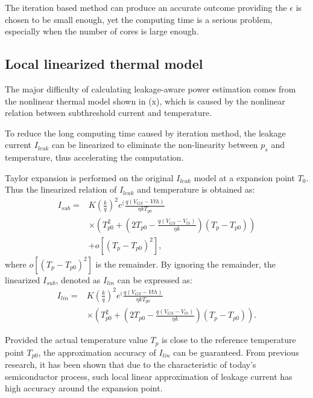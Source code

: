 The iteration based method can produce an accurate outcome providing the $\epsilon$ is chosen to be small enough, yet the computing time is a serious problem, especially when the number of cores is large enough.

\subsection{Local linearized thermal model}
The major difficulty of calculating leakage-aware power estimation comes from the nonlinear thermal model shown in (x), which is caused by the nonlinear relation between subthreshold current and temperature.

To reduce the long computing time caused by iteration method, the leakage current $I_{leak}$ can be linearized to eliminate the non-linearity between $p_{s}$ and temperature, thus accelerating the computation.

Taylor expansion is performed on the original $I_{leak}$ model at a expansion point $T_{0}$. Thus the linearized relation of $I_{leak}$ and temperature is obtained as:
\begin{equation}\label{linear_subthreshold}
\begin{split}
I_{sub} = &K(\frac{k}{q})^{2}e^(\frac{q(V_{GS}-V{th})}{\eta kT_{p0}}\\
&\times (T_{p0}^{2}+(2T_{p0}-\frac{q(V_{GS}-V_{th})}{\eta k})(T_{p}-T_{p0}))\\
&+ o[(T_{p}-T_{p0})^{2}],
\end{split}
\end{equation}
where $o[(T_{p}-T_{p0})^{2}]$ is the remainder. By ignoring the remainder, the linearized $I_{sub}$, denoted as $I_{lin}$ can be expressed as:
\begin{equation}\label{linear_subthreshold}
\begin{split}
I_{lin} = &K(\frac{k}{q})^{2}e^(\frac{q(V_{GS}-V{th})}{\eta kT_{p0}}\\
&\times (T_{p0}^{2}+(2T_{p0}-\frac{q(V_{GS}-V_{th})}{\eta k})(T_{p}-T_{p0})).
\end{split}
\end{equation}

Provided the actual temperature value $T_{p}$ is close to the reference temperature point $T_{p0}$, the approximation accuracy of $I_{lin}$ can be guaranteed. From previous research, it has been shown that due to the characteristic of today's semiconductor process, such local linear approximation of leakage current has high accuracy around the expansion point.

